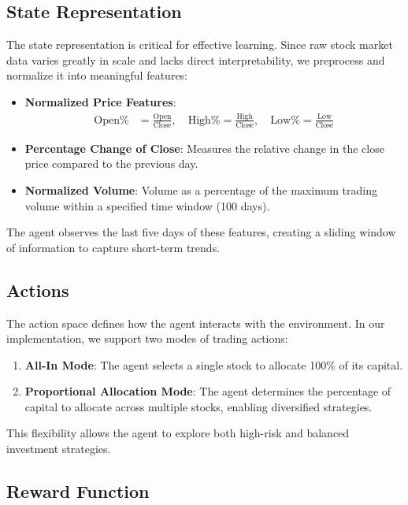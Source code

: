 \documentclass[conference]{IEEEtran}
\begin{document}
\subsection{State Representation}

The state representation is critical for effective learning. Since raw stock market data varies greatly in scale and lacks direct interpretability, we preprocess and normalize it into meaningful features:

\begin{itemize}
  \item \textbf{Normalized Price Features}:
    \begin{align*}
      \text{Open\%} &= \frac{\text{Open}}{\text{Close}}, \quad \text{High\%} = \frac{\text{High}}{\text{Close}}, \quad \text{Low\%} = \frac{\text{Low}}{\text{Close}}
    \end{align*}
  \item \textbf{Percentage Change of Close}: Measures the relative change in the close price compared to the previous day.
  \item \textbf{Normalized Volume}: Volume as a percentage of the maximum trading volume within a specified time window (100 days).
\end{itemize}

The agent observes the last five days of these features, creating a sliding window of information to capture short-term trends.

\subsection{Actions}

The action space defines how the agent interacts with the environment. In our implementation, we support two modes of trading actions:

\begin{enumerate}
  \item \textbf{All-In Mode}: The agent selects a single stock to allocate 100\% of its capital.
  \item \textbf{Proportional Allocation Mode}: The agent determines the percentage of capital to allocate across multiple stocks, enabling diversified strategies.
\end{enumerate}

This flexibility allows the agent to explore both high-risk and balanced investment strategies.

\subsection{Reward Function}
\end{document}
